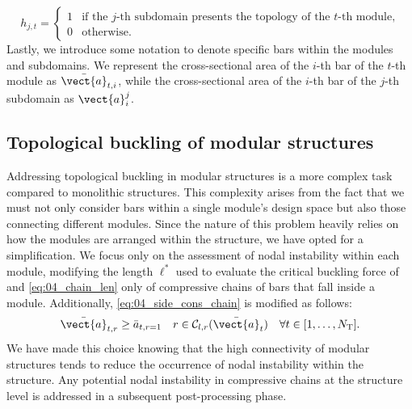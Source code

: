 \begin{equation}
    h_{j,t} =
    \begin{cases}
      1 & \text{if the $j$-th subdomain presents the topology of the $t$-th module,} \\
      0 & \text{otherwise.} 
    \end{cases}
\end{equation}
Lastly, we introduce some notation to denote specific bars within the modules and subdomains. We represent the cross-sectional area of the $i$-th bar of the $t$-th module as $\bar{\vect{a}}_{t,i}$, while the cross-sectional area of the $i$-th bar of the $j$-th subdomain as $\vect{a}^j_i$.
\subsection{Topological buckling of modular structures} \label{sec:05_topological}
Addressing topological buckling in modular structures is a more complex task compared to monolithic structures. This complexity arises from the fact that we must not only consider bars within a single module's design space but also those connecting different modules. Since the nature of this problem heavily relies on how the modules are arranged within the structure, we have opted for a simplification.  We focus only on the assessment of nodal instability within each module, modifying the length $\ell^*$ used to evaluate the critical buckling force of  and \eqref{eq:04_chain_len} only of compressive chains of bars that fall inside a module. Additionally, \eqref{eq:04_side_cons_chain} is modified as follows:
\begin{equation}\label{eq:05_side_cons_chain_modular}
    \bar{\vect{a}}_{t,r} \geq \bar{a}_{t,r=1} \quad r \in \mathcal{C}_{l,r}(\bar{\vect{a}}_t) \quad \forall t \in [1,\dots,N_\text{T}].
\end{equation}
We have made this choice knowing that the high connectivity of modular structures tends to reduce the occurrence of nodal instability within the structure. Any potential nodal instability in compressive chains at the structure level is addressed in a subsequent post-processing phase.

